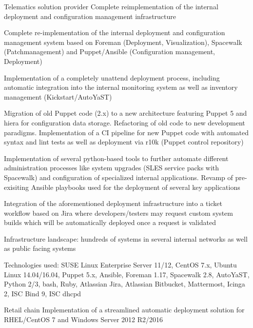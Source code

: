 \begin{cventries}
{\begin{cvitems}
      \end{cvitems}
    }
  \cventry
    {Telematics solution provider}
    {Complete reimplementation of the internal deployment and configuration management infrastructure}
    {}
    {}
    {
      \begin{cvitems}
      \item Complete re-implementation of the internal deployment and configuration management
        system based on Foreman (Deployment, Visualization), Spacewalk (Patchmanagement) and
        Puppet/Ansible (Configuration management, Deployment)
      \item Implementation of a completely unattend deployment process, including automatic
        integration into the internal monitoring system as well as inventory management
        (Kickstart/AutoYaST)
      \item Migration of old Puppet code (2.x) to a new architecture featuring Puppet 5 and hiera
        for configuration data storage. Refactoring of old code to new development paradigms.
        Implementation of a CI pipeline for new Puppet code with automated syntax and lint tests as
        well as deployment via r10k (Puppet control repository)
      \item Implementation of several python-based tools to further automate different
        administration processes like system upgrades (SLES service packs with Spacewalk) and
        configuration of specialized internal applications. Revamp of pre-exisiting Ansible
        playbooks used for the deployment of several key applications
      \item Integration of the aforementioned deployment infrastructure into a ticket workflow based
        on Jira where developers/testers may request custom system builds which will be
        automatically deployed once a request is validated
      \item Infrastructure landscape: hundreds of systems in several internal networks as well as
        public facing systems
      \item Technologies used: SUSE Linux Enterprise Server 11/12, CentOS 7.x, Ubuntu Linux
        14.04/16.04, Puppet 5.x, Ansible, Foreman 1.17, Spacewalk 2.8, AutoYaST, Python 2/3, bash,
        Ruby, Atlassian Jira, Atlassian Bitbucket, Mattermost, Icinga 2, ISC Bind 9, ISC dhcpd
      \end{cvitems}
    }
  \cventry
    {Retail chain}
    {Implementation of a streamlined automatic deployment solution for RHEL/CentOS 7 and Windows
      Server 2012 R2/2016}

\end{cventries}
